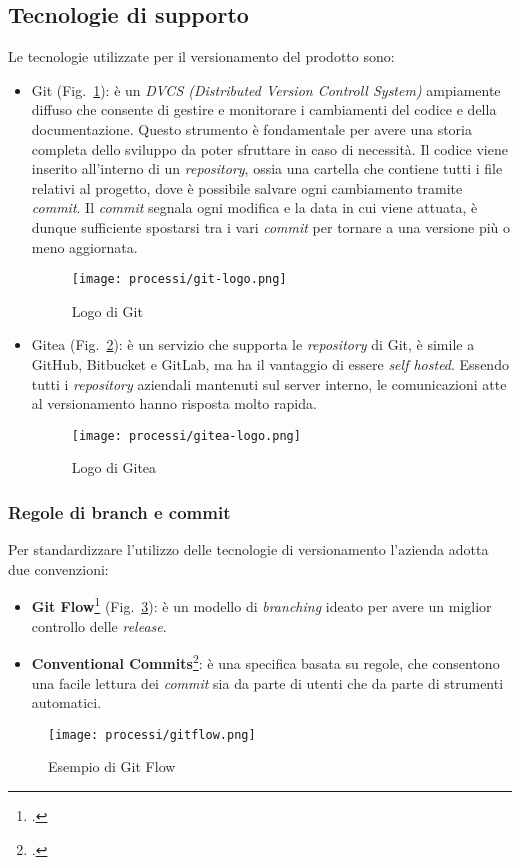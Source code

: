 \subsection{Tecnologie di supporto}
Le tecnologie utilizzate per il versionamento del prodotto sono:
\begin{itemize}
    \item Git (Fig.~\ref{fig:logo-git}): è un \emph{DVCS (Distributed Version Controll System)} ampiamente diffuso che consente di gestire e monitorare i cambiamenti del codice e della documentazione. Questo strumento è fondamentale per avere una storia completa dello sviluppo da poter sfruttare in caso di necessità. Il codice viene inserito all'interno di un \emph{repository}, ossia una cartella che contiene tutti i file relativi al progetto, dove è possibile salvare ogni cambiamento tramite \emph{commit}. Il \emph{commit} segnala ogni modifica e la data in cui viene attuata, è dunque sufficiente spostarsi tra i vari \emph{commit} per tornare a una versione più o meno aggiornata.  
    
    \begin{figure}[!h] 
        \centering 
        \texttt{[image: processi/git-logo.png]} 
        \caption{Logo di Git}
        \label{fig:logo-git}
      \end{figure}

    \item Gitea (Fig.~\ref{fig:logo-gitea}): è un servizio che supporta le \emph{repository} di Git, è simile a GitHub, Bitbucket e GitLab, ma ha il vantaggio di essere \emph{\gls{self hosted}}\glsfirstoccur. 
    Essendo tutti i \emph{repository} aziendali mantenuti sul server interno, le comunicazioni atte al versionamento hanno risposta molto rapida.

    \begin{figure}[!h] 
        \centering 
        \texttt{[image: processi/gitea-logo.png]} 
        \caption{Logo di Gitea}
        \label{fig:logo-gitea}
      \end{figure}
\end{itemize}

\newpage

\subsubsection{Regole di branch e commit}
Per standardizzare l'utilizzo delle tecnologie di versionamento l'azienda adotta due convenzioni:
\begin{itemize}
    \item \textbf{Git Flow}\footcite{site:gitflow} (Fig.~\ref{fig:schema-gitflow}): è un modello di \emph{branching} ideato per avere un miglior controllo delle \emph{release}.
    \item \textbf{Conventional Commits}\footcite{site:commits}: è una specifica basata su regole, che consentono una facile lettura dei \emph{commit} sia da parte di utenti che da parte di strumenti automatici. 
\end{itemize}

\begin{figure}[!h] 
    \centering 
    \texttt{[image: processi/gitflow.png]} 
    \caption{Esempio di Git Flow}
    \label{fig:schema-gitflow}
  \end{figure}

  